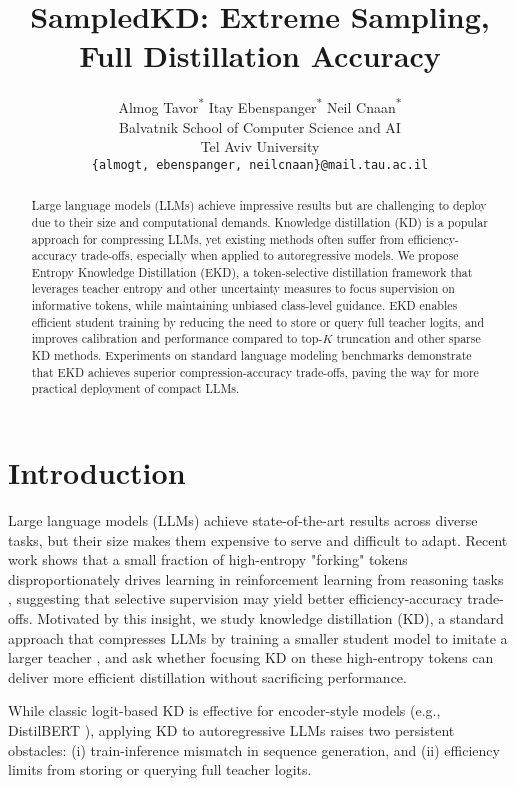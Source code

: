 \documentclass[11pt]{article}
\title{SampledKD: Extreme Sampling, Full Distillation Accuracy}
\author{
  Almog Tavor\textsuperscript{*} \qquad Itay Ebenspanger\textsuperscript{*} \qquad Neil Cnaan\textsuperscript{*} \\
  Balvatnik School of Computer Science and AI \\
  Tel Aviv University \\
  \texttt{\{almogt, ebenspanger, neilcnaan\}@mail.tau.ac.il} \\
}
\begin{document}
\maketitle
\let\thefootnote\relax
\footnotemark
{}
\begin{abstract}
	Large language models (LLMs) achieve impressive results but are challenging to deploy due to their size and computational demands. Knowledge distillation (KD) is a popular approach for compressing LLMs, yet existing methods often suffer from efficiency-accuracy trade-offs, especially when applied to autoregressive models. We propose Entropy Knowledge Distillation (EKD), a token-selective distillation framework that leverages teacher entropy and other uncertainty measures to focus supervision on informative tokens, while maintaining unbiased class-level guidance. EKD enables efficient student training by reducing the need to store or query full teacher logits, and improves calibration and performance compared to top-$K$ truncation and other sparse KD methods. Experiments on standard language modeling benchmarks demonstrate that EKD achieves superior compression-accuracy trade-offs, paving the way for more practical deployment of compact LLMs.
\end{abstract}

\section{Introduction}

Large language models (LLMs) achieve state-of-the-art results across diverse tasks, but their size makes them expensive to serve and difficult to adapt.
Recent work shows that a small fraction of high-entropy "forking" tokens disproportionately drives learning in reinforcement learning from reasoning tasks \citep{wang2025highentropy}, suggesting that selective supervision may yield better efficiency-accuracy trade-offs.
Motivated by this insight, we study knowledge distillation (KD), a standard approach that compresses LLMs by training a smaller student model to imitate a larger teacher \citep{hinton2015distillation}, and ask whether focusing KD on these high-entropy tokens can deliver more efficient distillation without sacrificing performance.

While classic logit-based KD is effective for encoder-style models (e.g., DistilBERT \citep{sanh2019distilbert}), applying KD to autoregressive LLMs raises two persistent obstacles: (i) train-inference mismatch in sequence generation, and (ii) efficiency limits from storing or querying full teacher logits.
\end{document}
